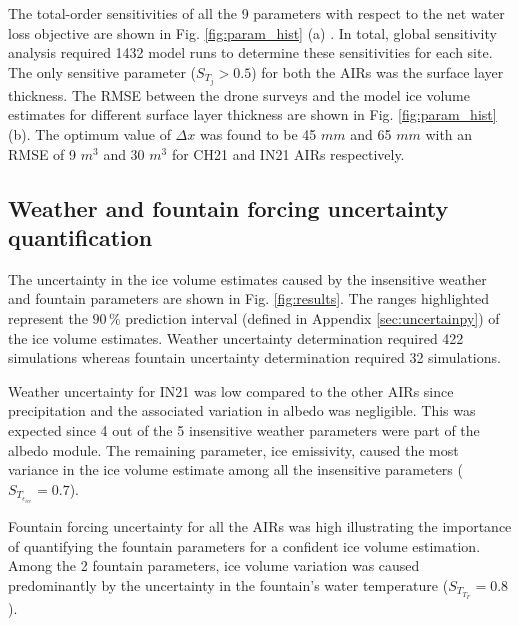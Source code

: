\documentclass[utf8]{frontiersSCNS}
\begin{document}
The total-order sensitivities of all the 9 parameters with respect to the net water loss objective are shown in
Fig. \ref{fig:param_hist} (a) . In total, global sensitivity analysis required 1432 model runs to determine these
sensitivities for each site. The only sensitive parameter ($S_{T_{j}} > 0.5$) for both the AIRs was the surface
layer thickness. The RMSE between the drone surveys and the model ice volume estimates for different surface
layer thickness are shown in Fig. \ref{fig:param_hist} (b). The optimum value of $\Delta x$ was found to be 45
$mm$ and 65 $mm$ with an RMSE of 9 $m^3$ and 30 $m^3$ for CH21 and IN21 AIRs respectively.


\subsection{Weather and fountain forcing uncertainty quantification}

The uncertainty in the ice volume estimates caused by the insensitive weather and fountain parameters are shown
in Fig. \ref{fig:results}. The ranges highlighted represent the $90\,\%$ prediction interval (defined in Appendix
\ref{sec:uncertainpy}) of the ice volume estimates. Weather uncertainty determination required 422 simulations
whereas fountain uncertainty determination required 32 simulations.

Weather uncertainty for IN21 was low compared to the other AIRs since precipitation and the associated variation
in albedo was negligible. This was expected since 4 out of the 5 insensitive weather parameters were part of the
albedo module. The remaining parameter, ice emissivity, caused the most variance in the ice volume estimate
among all the insensitive parameters ($S_{T_{\epsilon_{ice}}} = 0.7$).

Fountain forcing uncertainty for all the AIRs was high illustrating the importance of quantifying the fountain parameters for
a confident ice volume estimation. Among the 2 fountain parameters, ice volume variation was caused predominantly
by the uncertainty in the fountain's water temperature ($S_{T_{T_F}} = 0.8$).
\end{document}

